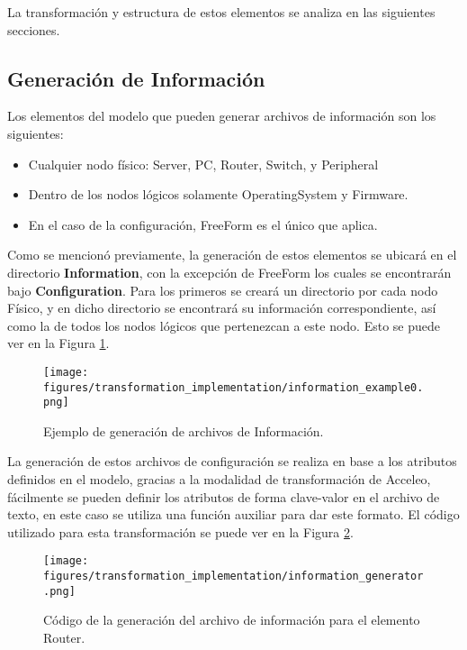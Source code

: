 La transformación y estructura de estos elementos se analiza en las siguientes secciones.

\subsection{Generación de Información}
Los elementos del modelo que pueden generar archivos de información son los siguientes:
\begin{itemize}
    \item Cualquier nodo físico: Server, PC, Router, Switch, y Peripheral
    \item Dentro de los nodos lógicos solamente OperatingSystem y Firmware.
    \item En el caso de la configuración, FreeForm es el único que aplica.
\end{itemize}

Como se mencionó previamente, la generación de estos elementos se ubicará en el directorio \textbf{Information}, con la excepción de FreeForm los cuales se encontrarán bajo \textbf{Configuration}. Para los primeros se creará un directorio por cada nodo Físico, y en dicho directorio se encontrará su información correspondiente, así como la de todos los nodos lógicos que pertenezcan a este nodo. Esto se puede ver en la Figura \ref{fig:transformation:information_example}.

\begin{figure}[htbp]
    \centering
    \texttt{[image: figures/transformation\_implementation/information\_example0.png]}
    \caption{Ejemplo de generación de archivos de Información.}
    \label{fig:transformation:information_example}
\end{figure}

La generación de estos archivos de configuración se realiza en base a los atributos definidos en el modelo, gracias a la modalidad de transformación de Acceleo, fácilmente se pueden definir los atributos de forma clave-valor en el archivo de texto, en este caso se utiliza una función auxiliar para dar este formato. El código utilizado para esta transformación se puede ver en la Figura \ref{fig:transformation:generator}.

\begin{figure}[htbp]
    \centering
    \texttt{[image: figures/transformation\_implementation/information\_generator.png]}
    \caption{Código de la generación del archivo de información para el elemento Router.}
    \label{fig:transformation:generator}
\end{figure}

